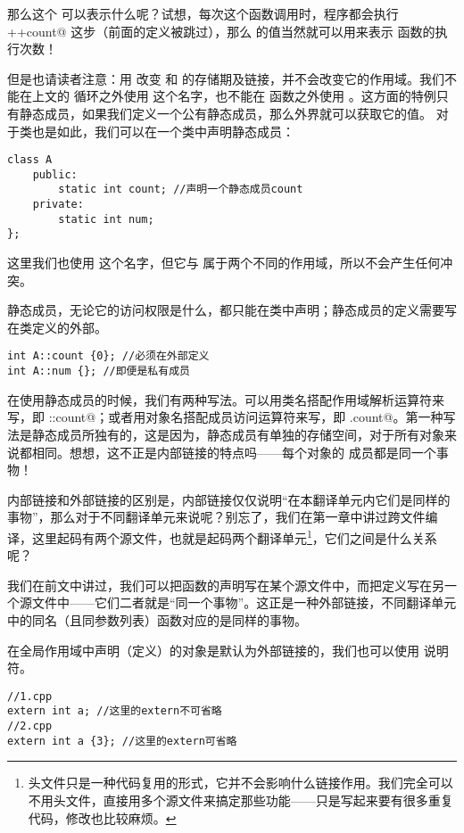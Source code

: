 那么这个 \lstinline@count@ 可以表示什么呢？试想，每次这个函数调用时，程序都会执行 \lstinline@++count@ 这步（前面的定义被跳过），那么 \lstinline@count@ 的值当然就可以用来表示 \lstinline@func@ 函数的执行次数！\par
但是也请读者注意：用 \lstinline@static@ 改变 \lstinline@x@ 和 \lstinline@count@ 的存储期及链接，并不会改变它的作用域。我们不能在上文的 \lstinline@for@ 循环之外使用 \lstinline@x@ 这个名字，也不能在 \lstinline@func@ 函数之外使用 \lstinline@count@。这方面的特例只有静态成员，如果我们定义一个公有静态成员，那么外界就可以获取它的值。
对于类也是如此，我们可以在一个类中声明静态成员：
\begin{lstlisting}
class A
    public:
        static int count; //声明一个静态成员count
    private:
        static int num;
};
\end{lstlisting}
这里我们也使用 \lstinline@count@ 这个名字，但它与 \lstinline@func@ 属于两个不同的作用域，所以不会产生任何冲突。\par
静态成员，无论它的访问权限是什么，都只能在类中声明；静态成员的定义需要写在类定义的外部。
\begin{lstlisting}
int A::count {0}; //必须在外部定义
int A::num {}; //即便是私有成员
\end{lstlisting}
在使用静态成员的时候，我们有两种写法。可以用类名搭配作用域解析运算符来写，即 \lstinline@A::count@；或者用对象名搭配成员访问运算符来写，即 \lstinline@a.count@。第一种写法是静态成员所独有的，这是因为，静态成员有单独的存储空间，对于所有对象来说都相同。想想，这不正是内部链接的特点吗——每个对象的 \lstinline@count@ 成员都是同一个事物！\par
内部链接和外部链接的区别是，内部链接仅仅说明``在本翻译单元内它们是同样的事物''，那么对于不同翻译单元来说呢？别忘了，我们在第一章中讲过跨文件编译，这里起码有两个源文件，也就是起码两个翻译单元\footnote{头文件只是一种代码复用的形式，它并不会影响什么链接作用。我们完全可以不用头文件，直接用多个源文件来搞定那些功能——只是写起来要有很多重复代码，修改也比较麻烦。}，它们之间是什么关系呢？\par
我们在前文中讲过，我们可以把函数的声明写在某个源文件中，而把定义写在另一个源文件中——它们二者就是``同一个事物''。这正是一种外部链接，不同翻译单元中的同名（且同参数列表）函数对应的是同样的事物。\par
在全局作用域中声明（定义）的对象是默认为外部链接的，我们也可以使用 \lstinline@extern@ 说明符。
\begin{lstlisting}
//1.cpp
extern int a; //这里的extern不可省略
//2.cpp
extern int a {3}; //这里的extern可省略
\end{lstlisting}
